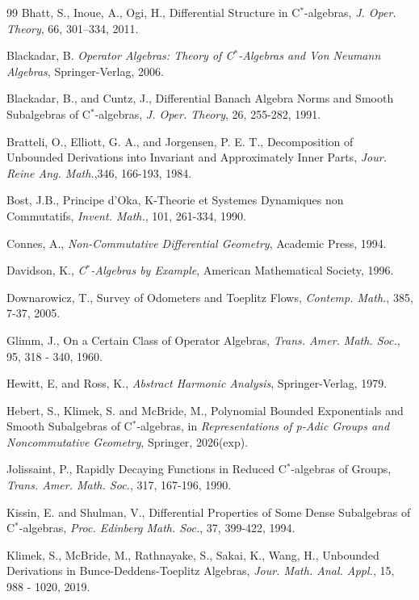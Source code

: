 \documentclass[12pt,reqno]{amsart}
\numberwithin{equation}{section}
\begin{document}
\begin{thebibliography}{99}
 Bhatt, S., Inoue, A., Ogi, H., Differential Structure in C$^*$-algebras, \textit{J. Oper. Theory}, 66, 301–334, 2011.

Blackadar, B. {\it Operator Algebras: Theory of C$^*$-Algebras and Von Neumann Algebras}, Springer-Verlag, 2006.

Blackadar, B., and Cuntz, J., Differential Banach Algebra Norms and Smooth Subalgebras of C$^*$-algebras, {\it J. Oper. Theory}, 26, 255-282, 1991.

Bratteli, O., Elliott, G. A., and Jorgensen, P. E. T., Decomposition of Unbounded Derivations into Invariant and Approximately Inner Parts, {\it Jour. Reine Ang. Math.},346, 166-193, 1984.

Bost, J.B., Principe d'Oka, K-Theorie et Systemes Dynamiques non Commutatifs, {\it Invent. Math.}, 101, 261-334, 1990.

Connes, A., {\it Non-Commutative Differential Geometry}, Academic Press, 1994.

Davidson, K., {\it C$^*$-Algebras by Example}, American Mathematical Society, 1996.

Downarowicz, T., Survey of Odometers and Toeplitz Flows, {\it Contemp. Math.}, 385, 7-37, 2005. 

Glimm, J., On a Certain Class of Operator Algebras, {\it Trans. Amer. Math. Soc.}, 95, 318 - 340, 1960.

Hewitt, E, and Ross, K., {\it Abstract Harmonic Analysis}, Springer-Verlag, 1979.

Hebert, S., Klimek, S. and McBride, M., Polynomial Bounded Exponentials and Smooth Subalgebras of C$^*$-algebras, in {\it Representations of p-Adic Groups and Noncommutative Geometry}, Springer, 2026(exp).

 Jolissaint, P., Rapidly Decaying Functions in Reduced C$^*$-algebras of Groups, \textit{Trans. Amer. Math. Soc.}, 317, 167-196, 1990.

 Kissin, E. and Shulman, V., Differential Properties of Some Dense Subalgebras of C$^*$-algebras, \textit{Proc. Edinberg Math. Soc.}, 37, 399-422, 1994.

Klimek, S., McBride, M., Rathnayake, S., Sakai, K., Wang, H., Unbounded Derivations in Bunce-Deddens-Toeplitz Algebras, {\it Jour. Math. Anal. Appl.}, 15, 988 - 1020, 2019.


\end{thebibliography}
\end{document}
